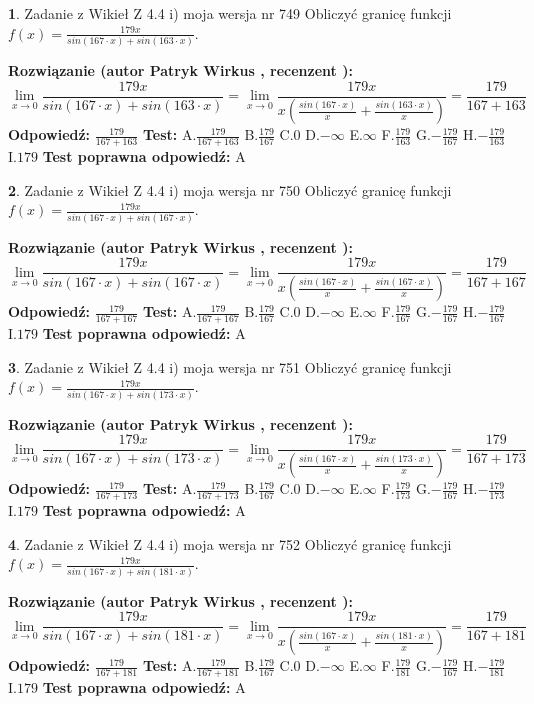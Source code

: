 \documentclass[12pt, a4paper]{article}
\theoremstyle{definition} %
\newtheorem{zad}{}
\newcommand{\zadStart}[1]{\begin{zad}#1\newline}
\newcommand{\zadStop}{\end{zad}}
\newcommand{\rozwStart}[2]{\noindent \textbf{Rozwiązanie (autor #1 , recenzent #2): }\newline}
\newcommand{\rozwStop}{\newline}
\newcommand{\odpStart}{\noindent \textbf{Odpowiedź:}\newline}
\newcommand{\odpStop}{\newline}
\newcommand{\testStart}{\noindent \textbf{Test:}\newline}
\newcommand{\testStop}{\newline}
\newcommand{\kluczStart}{\noindent \textbf{Test poprawna odpowiedź:}\newline}
\newcommand{\kluczStop}{\newline}
\begin{document}
\zadStart{Zadanie z Wikieł Z 4.4 i) moja wersja nr 749}
Obliczyć granicę funkcji $f(x)=\frac{179x}{sin(167\cdot x) +sin(163\cdot x)}$.
\zadStop
\rozwStart{Patryk Wirkus}{}
$$\lim\limits_{x\to 0}\frac{179x}{sin(167\cdot x) +sin(163\cdot x)}=\lim\limits_{x\to 0}\frac{179x}{x(\frac{sin(167\cdot x)}{x}+\frac{sin(163\cdot x)}{x})}=\frac{179}{167+163}$$
\rozwStop
\odpStart
$\frac{179}{167+163}$
\odpStop
\testStart
A.$\frac{179}{167+163}$
B.$\frac{179}{167}$
C.$0$
D.$-\infty$
E.$\infty$
F.$\frac{179}{163}$
G.$-\frac{179}{167}$
H.$-\frac{179}{163}$
I.$179$
\testStop
\kluczStart
A
\kluczStop



\zadStart{Zadanie z Wikieł Z 4.4 i) moja wersja nr 750}
Obliczyć granicę funkcji $f(x)=\frac{179x}{sin(167\cdot x) +sin(167\cdot x)}$.
\zadStop
\rozwStart{Patryk Wirkus}{}
$$\lim\limits_{x\to 0}\frac{179x}{sin(167\cdot x) +sin(167\cdot x)}=\lim\limits_{x\to 0}\frac{179x}{x(\frac{sin(167\cdot x)}{x}+\frac{sin(167\cdot x)}{x})}=\frac{179}{167+167}$$
\rozwStop
\odpStart
$\frac{179}{167+167}$
\odpStop
\testStart
A.$\frac{179}{167+167}$
B.$\frac{179}{167}$
C.$0$
D.$-\infty$
E.$\infty$
F.$\frac{179}{167}$
G.$-\frac{179}{167}$
H.$-\frac{179}{167}$
I.$179$
\testStop
\kluczStart
A
\kluczStop



\zadStart{Zadanie z Wikieł Z 4.4 i) moja wersja nr 751}
Obliczyć granicę funkcji $f(x)=\frac{179x}{sin(167\cdot x) +sin(173\cdot x)}$.
\zadStop
\rozwStart{Patryk Wirkus}{}
$$\lim\limits_{x\to 0}\frac{179x}{sin(167\cdot x) +sin(173\cdot x)}=\lim\limits_{x\to 0}\frac{179x}{x(\frac{sin(167\cdot x)}{x}+\frac{sin(173\cdot x)}{x})}=\frac{179}{167+173}$$
\rozwStop
\odpStart
$\frac{179}{167+173}$
\odpStop
\testStart
A.$\frac{179}{167+173}$
B.$\frac{179}{167}$
C.$0$
D.$-\infty$
E.$\infty$
F.$\frac{179}{173}$
G.$-\frac{179}{167}$
H.$-\frac{179}{173}$
I.$179$
\testStop
\kluczStart
A
\kluczStop



\zadStart{Zadanie z Wikieł Z 4.4 i) moja wersja nr 752}
Obliczyć granicę funkcji $f(x)=\frac{179x}{sin(167\cdot x) +sin(181\cdot x)}$.
\zadStop
\rozwStart{Patryk Wirkus}{}
$$\lim\limits_{x\to 0}\frac{179x}{sin(167\cdot x) +sin(181\cdot x)}=\lim\limits_{x\to 0}\frac{179x}{x(\frac{sin(167\cdot x)}{x}+\frac{sin(181\cdot x)}{x})}=\frac{179}{167+181}$$
\rozwStop
\odpStart
$\frac{179}{167+181}$
\odpStop
\testStart
A.$\frac{179}{167+181}$
B.$\frac{179}{167}$
C.$0$
D.$-\infty$
E.$\infty$
F.$\frac{179}{181}$
G.$-\frac{179}{167}$
H.$-\frac{179}{181}$
I.$179$
\testStop
\kluczStart
A
\kluczStop
\end{document}
